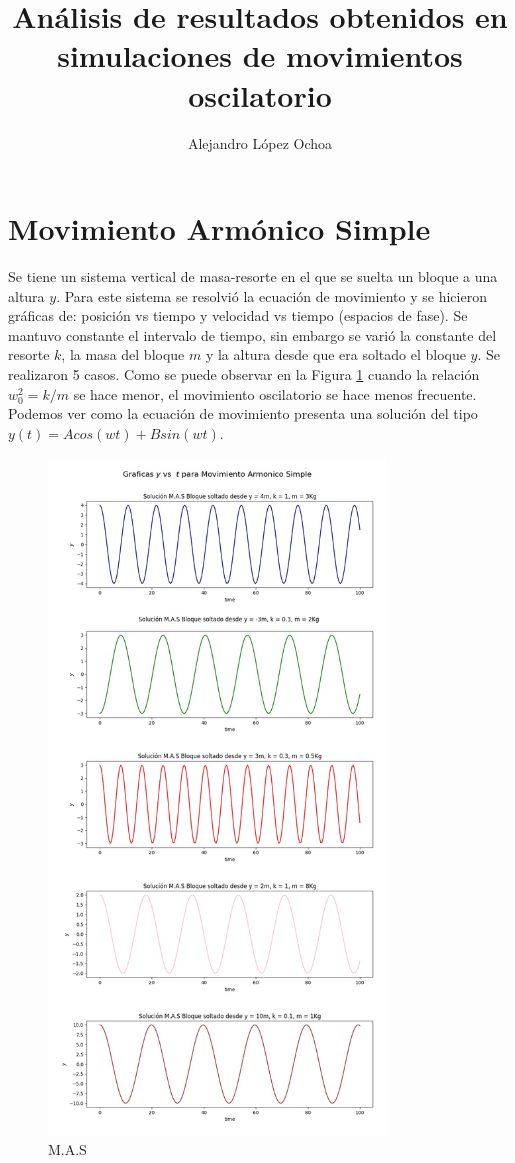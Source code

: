 \documentclass[a4paper]{article}
\title{Análisis de resultados obtenidos en simulaciones de movimientos oscilatorio }
\author{Alejandro López Ochoa}
\begin{document}
\maketitle



\section{Movimiento Armónico Simple}

Se tiene un sistema vertical de masa-resorte en el que se suelta un bloque a una altura $y$. Para este sistema se resolvió la ecuación de movimiento y se hicieron gráficas de: posición vs tiempo y velocidad vs tiempo (espacios de fase). Se mantuvo constante el intervalo de tiempo, sin embargo se varió la constante del resorte $k$, la masa del bloque $m$ y la altura desde que era soltado el bloque $y$. Se realizaron 5 casos. Como se puede observar en la Figura \ref{fig:Figura1} cuando la relación $w_{0}^{2}=k/m$ se hace menor, el movimiento oscilatorio se hace menos frecuente. Podemos ver como la ecuación de movimiento presenta una solución del tipo $y(t)=Acos(wt)+Bsin(wt)$.

\begin{figure}
\centering
\includegraphics[width=0.8\textwidth]{MAS.jpg}
\caption{M.A.S}
\label{fig:Figura1}
\end{figure}
\end{document}
